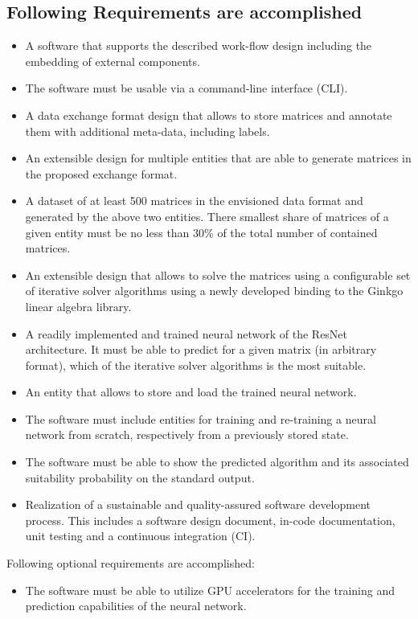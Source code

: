\documentclass[parskip=full]{scrartcl}
\begin{document}
\subsection{Following Requirements are accomplished}
\begin{itemize}

\item A software that supports the described work-flow design including the embedding of external components.

\item The software must be usable via a \gls{command-line interface} (CLI).

\item A data exchange format design that allows to store matrices and annotate them with 
additional meta-data, including labels.

\item An extensible design for multiple entities that are able to generate matrices in the proposed exchange format.

\item A dataset of at least 500 matrices in the envisioned data format and generated by the above two entities. 
There smallest share of matrices of a given entity must be no less than 30\% of the total number of contained matrices.

\item An extensible design that allows to solve the matrices using a configurable set of \gls{iterative solver} algorithms using a newly developed binding to the \gls{Ginkgo} linear algebra library.

\item A readily implemented and trained \gls{neural network} of the \gls{ResNet} architecture. 
It must be able to predict for a given matrix (in arbitrary format), which of the \gls{iterative solver} algorithms is the most suitable.

\item An entity that allows to store and load the trained \gls{neural network}.

\item The software must include entities for training and re-training a \gls{neural network} from scratch, respectively from a previously stored state.

\item The software must be able to show the predicted \gls{algorithm} and its associated suitability probability on the standard output.

\item Realization of a sustainable and quality-assured software development process. 
This includes a software design document, in-code documentation, unit testing and a continuous integration (CI).
\end{itemize}
Following optional requirements are accomplished:
\begin{itemize}
\item The software must be able to utilize GPU accelerators for the training and prediction capabilities of the neural network.
\end{itemize}
\end{document}
